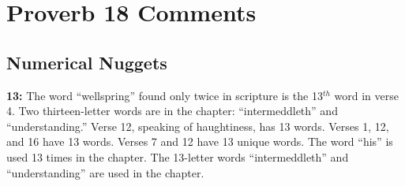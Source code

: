 \section{Proverb 18 Comments}

\subsection{Numerical Nuggets}
\textbf{13:} The word ``wellspring'' found only twice in scripture is the 13$^{th}$ word in verse 4. Two thirteen-letter words are in the chapter: ``intermeddleth'' and ``understanding.'' Verse 12, speaking of haughtiness, has 13 words. Verses 1, 12, and 16 have 13 words. Verses 7 and 12 have 13 unique words. The word ``his'' is used 13 times in the chapter. The 13-letter words ``intermeddleth'' and ``understanding'' are used in the chapter.

